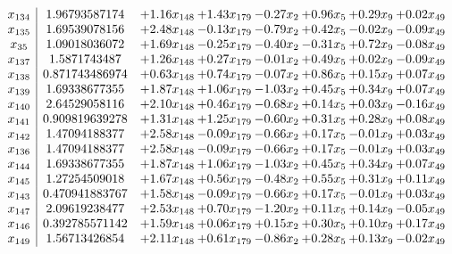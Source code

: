 \documentclass[8pt]{article}
\begin{document}
\[\begin{array}{c| c c@{\hskip 2pt} c@{\hskip 2pt} c@{\hskip 2pt} c@{\hskip 2pt} c@{\hskip 2pt} c@{\hskip 2pt} }
 x_{134}   &  1.96793587174 & +  1.16 x_{148} & +  1.43 x_{179} & -0.27 x_{2} & +  0.96 x_{5} & +  0.29 x_{9} & +  0.02 x_{49}\\
 x_{135}   &  1.69539078156 & +  2.48 x_{148} & -0.13 x_{179} & -0.79 x_{2} & +  0.42 x_{5} & -0.02 x_{9} & -0.09 x_{49}\\
 x_{35}   &  1.09018036072 & +  1.69 x_{148} & -0.25 x_{179} & -0.40 x_{2} & -0.31 x_{5} & +  0.72 x_{9} & -0.08 x_{49}\\
 x_{137}   &  1.5871743487 & +  1.26 x_{148} & +  0.27 x_{179} & -0.01 x_{2} & +  0.49 x_{5} & +  0.02 x_{9} & -0.09 x_{49}\\
 x_{138}   &  0.871743486974 & +  0.63 x_{148} & +  0.74 x_{179} & -0.07 x_{2} & +  0.86 x_{5} & +  0.15 x_{9} & +  0.07 x_{49}\\
 x_{139}   &  1.69338677355 & +  1.87 x_{148} & +  1.06 x_{179} & -1.03 x_{2} & +  0.45 x_{5} & +  0.34 x_{9} & +  0.07 x_{49}\\
 x_{140}   &  2.64529058116 & +  2.10 x_{148} & +  0.46 x_{179} & -0.68 x_{2} & +  0.14 x_{5} & +  0.03 x_{9} & -0.16 x_{49}\\
 x_{141}   &  0.909819639278 & +  1.31 x_{148} & +  1.25 x_{179} & -0.60 x_{2} & +  0.31 x_{5} & +  0.28 x_{9} & +  0.08 x_{49}\\
 x_{142}   &  1.47094188377 & +  2.58 x_{148} & -0.09 x_{179} & -0.66 x_{2} & +  0.17 x_{5} & -0.01 x_{9} & +  0.03 x_{49}\\
 x_{136}   &  1.47094188377 & +  2.58 x_{148} & -0.09 x_{179} & -0.66 x_{2} & +  0.17 x_{5} & -0.01 x_{9} & +  0.03 x_{49}\\
 x_{144}   &  1.69338677355 & +  1.87 x_{148} & +  1.06 x_{179} & -1.03 x_{2} & +  0.45 x_{5} & +  0.34 x_{9} & +  0.07 x_{49}\\
 x_{145}   &  1.27254509018 & +  1.67 x_{148} & +  0.56 x_{179} & -0.48 x_{2} & +  0.55 x_{5} & +  0.31 x_{9} & +  0.11 x_{49}\\
 x_{143}   &  0.470941883767 & +  1.58 x_{148} & -0.09 x_{179} & -0.66 x_{2} & +  0.17 x_{5} & -0.01 x_{9} & +  0.03 x_{49}\\
 x_{147}   &  2.09619238477 & +  2.53 x_{148} & +  0.70 x_{179} & -1.20 x_{2} & +  0.11 x_{5} & +  0.14 x_{9} & -0.05 x_{49}\\
 x_{146}   &  0.392785571142 & +  1.59 x_{148} & +  0.06 x_{179} & +  0.15 x_{2} & +  0.30 x_{5} & +  0.10 x_{9} & +  0.17 x_{49}\\
 x_{149}   &  1.56713426854 & +  2.11 x_{148} & +  0.61 x_{179} & -0.86 x_{2} & +  0.28 x_{5} & +  0.13 x_{9} & -0.02 x_{49}\\

\end{array}\]
\end{document}
